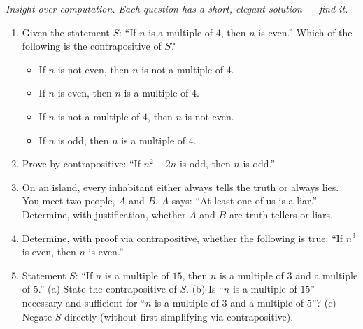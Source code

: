 \documentclass[11pt,a4paper]{article}
\begin{document}
\noindent\textit{Insight over computation. Each question has a short, elegant solution --- find it.}

\begin{enumerate}

\item Given the statement $S$: ``If $n$ is a multiple of $4$, then $n$ is even.'' Which of the following is the contrapositive of $S$?
\begin{itemize}
\item[A)] If $n$ is not even, then $n$ is not a multiple of $4$.
\item[B)] If $n$ is even, then $n$ is a multiple of $4$.
\item[C)] If $n$ is not a multiple of $4$, then $n$ is not even.
\item[D)] If $n$ is odd, then $n$ is a multiple of $4$.
\end{itemize}

\item Prove by contrapositive: ``If $n^2 - 2n$ is odd, then $n$ is odd.''

\item On an island, every inhabitant either always tells the truth or always lies. You meet two people, $A$ and $B$. $A$ says: ``At least one of us is a liar.'' Determine, with justification, whether $A$ and $B$ are truth-tellers or liars.

\item Determine, with proof via contrapositive, whether the following is true: ``If $n^3$ is even, then $n$ is even.''

\item Statement $S$: ``If $n$ is a multiple of $15$, then $n$ is a multiple of $3$ and a multiple of $5$.'' (a) State the contrapositive of $S$. (b) Is ``$n$ is a multiple of $15$'' necessary and sufficient for ``$n$ is a multiple of $3$ and a multiple of $5$''? (c) Negate $S$ directly (without first simplifying via contrapositive).

\end{enumerate}

\end{document}
